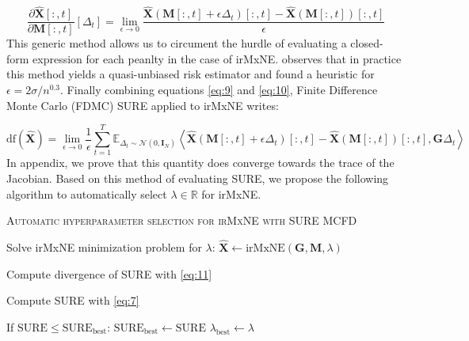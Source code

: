 \begin{equation} \label{eq:10}
    \frac{\partial \widehat{\mathbf{X}}[:, t]}{\partial \mathbf{M}[:, t]} 
    [\Delta_t]
    = \lim_{\epsilon \rightarrow 0}
    \frac{
        \widehat{\mathbf{X}}(\mathbf{M}[:, t] + \epsilon \Delta_t)[:, t]
        -
        \widehat{\mathbf{X}}(\mathbf{M}[:, t])[:, t]
    }{\epsilon}
\end{equation}
%
This generic method allows us to circument the hurdle of evaluating a closed-form expression for each peanlty
in the case of irMxNE. \cite{Deledalle_Vaiter_Fadili_Peyre14} observes that in practice this method yields a 
quasi-unbiased risk estimator and found a heuristic for $\epsilon = 2\sigma / n^{0.3}$. Finally combining equations
\eqref{eq:9} and \eqref{eq:10}, Finite Difference Monte Carlo (FDMC) SURE applied to irMxNE writes:

\begin{equation} \label{eq:11}
    \text{df}(\widehat{\mathbf{X}}) = 
    \lim_{\epsilon \rightarrow 0}
    \frac{1}{\epsilon}
    \sum_{t=1}^T
    \mathbb{E}_{\Delta_t \sim \mathcal{N}(0, \mathbf{I}_N)}
    \left\langle
        \widehat{\mathbf{X}}(\mathbf{M}[:, t] + \epsilon \Delta_t)[:, t]
        -
        \widehat{\mathbf{X}}(\mathbf{M}[:, t])[:, t]
        ,
        \mathbf{G}\Delta_t
    \right\rangle
\end{equation}
%
In appendix, we prove that this quantity does converge towards the trace of the Jacobian. Based on this method of 
evaluating SURE, we propose the following algorithm to automatically select $\lambda \in \mathbb{R}$ for irMxNE.

\vskip 0.2in

{\fontsize{4}{4}\selectfont
\begin{algorithm}[h]  %
\caption{\textsc{Automatic hyperparameter selection for irMxNE with SURE MCFD}
}
%

    {
        Solve irMxNE minimization problem for $\lambda$:
        $\widehat{\mathbf{X}} \leftarrow \text{irMxNE}(\mathbf{G}, \mathbf{M}, \lambda)$

        Compute divergence of SURE with \eqref{eq:11}

        Compute SURE with \eqref{eq:7}

        If $\text{SURE} \leq \text{SURE}_{\text{best}}$:
        $\text{SURE}_{\text{best}} \leftarrow \text{SURE}$
        $\lambda_{\text{best}} \leftarrow \lambda$
    }

\end{algorithm}
}


